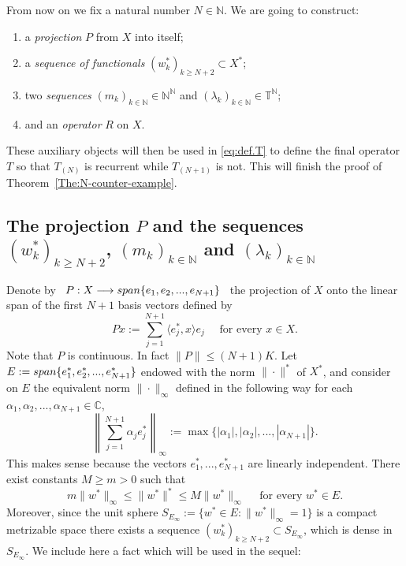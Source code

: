 \documentclass[openright,11pt]{article}
\theoremstyle{plain}
\theoremstyle{definition}
\newcommand{\NN}{\mathbb{N}}
\newcommand{\CC}{\mathbb{C}}
\newcommand{\TT}{\mathbb{T}}
\newcommand{\lspan}{\textup{span}}
\newcommand{\ep}[2]{\langle #1 , #2 \rangle}
\begin{document}
From now on we fix a natural number $N \in \NN$. We are going to construct:
\begin{enumerate}[--]
	\item a {\em projection} $P$ from $X$ into itself;
	
	\item a {\em sequence of functionals} $(w_k^*)_{k\geq N+2} \subset X^*$;
	
	\item two {\em sequences} $(m_k)_{k\in\NN} \in \NN^{\NN}$ and $(\lambda_k)_{k\in\NN} \in \TT^{\NN}$;
	
	\item and an {\em operator} $R$ on $X$.
\end{enumerate}
These auxiliary objects will then be used in \eqref{eq:def.T} to define the final operator $T$ so that $T_{(N)}$ is recurrent while $T_{(N+1)}$ is not. This will finish the proof of Theorem~\ref{The:N-counter-example}.

\subsection{The projection $P$ and the sequences $(w_k^*)_{k\geq N+2}$, $(m_k)_{k\in\NN}$ and $(\lambda_k)_{k\in\NN}$}


Denote by \ $P:X\longrightarrow \lspan\{e_1,e_2,...,e_{N+1}\}$ \ the projection of $X$ onto the linear span of the first $N+1$ basis vectors defined by
\[
Px := \sum_{j=1}^{N+1} \ep{e_j^*}{x} e_j \quad \text{ for every } x \in X.
\]
Note that $P$ is continuous. In fact $\|P\| \leq (N+1)K$. %
Let $E := \lspan\{e_1^*,e_2^*,...,e_{N+1}^*\}$ endowed with the norm $\|\cdot\|^*$ of $X^*$, and consider on $E$ the equivalent norm $\|\cdot\|_{\infty}$ defined in the following way for each $\alpha_1,\alpha_2,...,\alpha_{N+1} \in \CC$,
\[
\left\| \sum_{j=1}^{N+1} \alpha_j e_j^* \right\|_{\infty} := \max\{|\alpha_1|,|\alpha_2|,...,|\alpha_{N+1}|\}.
\]
This makes sense because the vectors $e_1^*,...,e_{N+1}^*$ are linearly independent. There exist constants $M \geq m >0$ such that
\[
m \|w^*\|_{\infty} \leq \|w^*\|^* \leq M \|w^*\|_{\infty} \quad \text{ for every } w^* \in E.
\]
Moreover, since the unit sphere $S_{E_{\infty}} := \{ w^* \in E : \|w^*\|_{\infty} = 1 \}$ is a compact metrizable space there exists a sequence $(w_k^*)_{k\geq N+2} \subset S_{E_{\infty}}$, which is dense in $S_{E_{\infty}}$. We include here a fact which will be used in the sequel:
\end{document}
